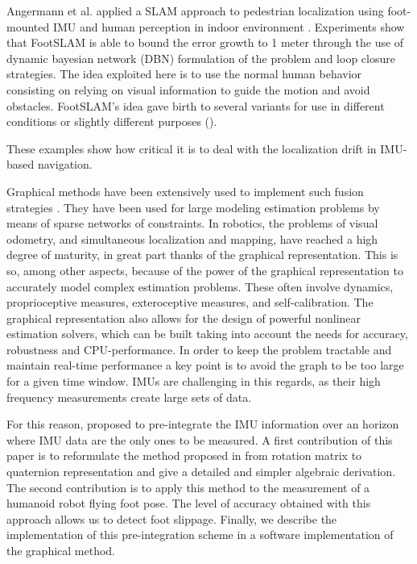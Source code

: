 Angermann et al. applied a SLAM approach to pedestrian localization using foot-mounted IMU and human perception in indoor environment \cite{angermann2012footslam}. Experiments show that
FootSLAM is able to bound the error growth to 1 meter through the use of dynamic bayesian network (DBN) formulation of the problem and loop closure strategies. The idea exploited here is to use the normal human behavior 
consisting on relying on visual information to guide the motion and avoid obstacles. FootSLAM's idea gave birth to several variants for use in different conditions or slightly different purposes (\cite{puyol2012complexity,bruno2011wislam}).


These examples show how critical it is to deal with the localization drift in IMU-based navigation.



Graphical methods have been extensively used to implement such fusion strategies \cite{Thrun:ijrr:2006,Kaess:itro:2008}.
They have been used for large modeling estimation problems by means of sparse networks of constraints. 
In robotics, the problems of visual odometry, and simultaneous localization and mapping, have reached a high degree of maturity, 
in great part thanks of the graphical representation. 
This is so, among other aspects, because of the power of the graphical representation to accurately model complex estimation problems. 
These often involve dynamics, proprioceptive measures, exteroceptive measures, and self-calibration.
The graphical representation also allows for the design of powerful nonlinear estimation solvers, which can be built taking into account the needs for accuracy, 
robustness and CPU-performance.
In order to keep the problem tractable and maintain real-time performance a key point is to avoid the graph to be too large for a given time window.
IMUs are challenging in this regards, as their high frequency measurements create large sets of data. 
 
For this reason, \cite{LUPTON-09,forster2015imu} proposed to pre-integrate the IMU information over an horizon where IMU data are the only
ones to be measured.
A first contribution of this paper is to reformulate the method proposed in \cite{forster2015imu} from rotation matrix to quaternion representation
and give a detailed and simpler algebraic derivation.
The second contribution is to apply this method to the measurement of a humanoid robot flying foot pose.
The level of accuracy obtained with this approach allows us to detect foot slippage. 
Finally, we describe the implementation of this pre-integration scheme in a software implementation of the graphical method.






